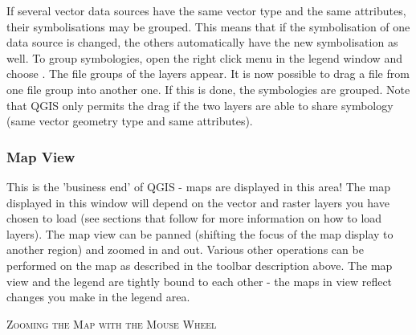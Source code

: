 If several vector data sources have the same vector type and the same attributes, their 
symbolisations may be grouped. This means that if the symbolisation of one data source is 
changed, the others automatically have the new symbolisation as well. To group symbologies, open 
the right click menu in the legend window and choose . The file groups of the 
layers appear. It is now possible to drag a file from one file group into another one. If this is done, 
the symbologies are grouped. Note that QGIS only permits the drag if the two layers are able to share 
symbology (same vector geometry type and same attributes).  

%

\subsubsection{Map View}\label{label_mapview}

This is the 'business end' of QGIS - maps are displayed in this area! The
map displayed in this window will depend on the vector and raster layers you
have chosen to load (see sections that follow for more information on how to
load layers). The map view can be panned (shifting the focus of the map display
to another region) and zoomed in and out. Various other operations can be
performed on the map as described in the toolbar description above.  The map
view and the legend are tightly bound to each other - the maps in view reflect
changes you make in the legend area.  

\begin{Tip}\caption{\textsc{Zooming the Map with the Mouse
Wheel}}
\end{Tip}

